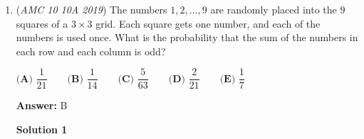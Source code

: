 \begin{enumerate}
 We can also see that the limit of the function is at least $-1$ since at the minimum, two of the numbers are less than $1$, but two are between $1$ and $2$.

 



\textbf{Solution 7 (also calculus but more convoluted)}

We can ignore the $2019$ and consider it later, as it is a constant. By difference of squares, we can group this into $\left((x+2.5)^2-0.5^2\right)\left((x+2.5)^2-1.5^2\right)$. We pull a factor of $4$ into each term to avoid dealing with decimals: 

 
 \[\dfrac{\left((2x+5)^2-1\right)\left((2x+5)^2-9\right)}{16}.\]

 Now, we let $a=2x+5$. Our expression becomes: 

 
 \[\dfrac{(a-1)(a-9)}{16}=\dfrac{a^2-10a+9}{16}.\]

 Taking the derivative, we get $\dfrac{2a-10}{16}=\dfrac{a-5}8.$ This is equal to $0$ when $a=5$, and plugging in $a=5$, we get the expression is equal to $-1$ and therefore our answer is $2019-1=\boxed{\text{(B)}~2018}.$




\textbf{Solution 8 (basically a more detailed version of solution 1)}

$(x+1)(x+2)(x+3)(x+4)$ can be rewritten as $[(x+1)(x+4)][(x+2)(x+3)]=(x^2+5x+4)(x^2+5x+6)$. Setting $a=x^2+5x+5$ gives $(a-1)(a+1)=a^2 -1$. 

 Then the whole problem can be written as the minimum value of $(a^2 -1)+2019$. $\min(a^2)=0$ as long as $x^2 +5x+5$ has at least one real root, which we can verify with $(b^2-4ac) \to (5^2)-(4 \times 1 \times 5)=5 \geq 0$. Thus, the answer is $(0-1)+2019= \boxed{\textbf{(B) }2018}$. 

 


	\item (\textit{AMC 10 10A 2019}) The numbers $1,2,\dots,9$ are randomly placed into the $9$ squares of a $3 \times 3$ grid. Each square gets one number, and each of the numbers is used once. What is the probability that the sum of the numbers in each row and each column is odd?


 $\textbf{(A) }\dfrac{1}{21}\qquad\textbf{(B) }\dfrac{1}{14}\qquad\textbf{(C) }\dfrac{5}{63}\qquad\textbf{(D) }\dfrac{2}{21}\qquad\textbf{(E) }\dfrac{1}{7}$

 \textbf{Answer: }B



\textbf{Solution 1}


\end{enumerate}
